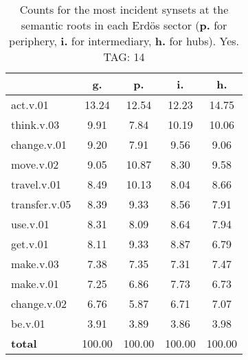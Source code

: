 \begin{table}[h!]
\begin{center}
\begin{tabular}{| l || c | c | c | c |}\hline
 & {\bf g.} & {\bf p.} & {\bf i.} & {\bf h.} \\\hline\hline
act.v.01 & 13.24  & 12.54  & 12.23  & 14.75 \\\hline
think.v.03 & 9.91  & 7.84  & 10.19  & 10.06 \\\hline
change.v.01 & 9.20  & 7.91  & 9.56  & 9.06 \\\hline
move.v.02 & 9.05  & 10.87  & 8.30  & 9.58 \\\hline
travel.v.01 & 8.49  & 10.13  & 8.04  & 8.66 \\\hline
transfer.v.05 & 8.39  & 9.33  & 8.56  & 7.91 \\\hline
use.v.01 & 8.31  & 8.09  & 8.64  & 7.94 \\\hline
get.v.01 & 8.11  & 9.33  & 8.87  & 6.79 \\\hline
make.v.03 & 7.38  & 7.35  & 7.31  & 7.47 \\\hline
make.v.01 & 7.25  & 6.86  & 7.73  & 6.73 \\\hline
change.v.02 & 6.76  & 5.87  & 6.71  & 7.07 \\\hline
be.v.01 & 3.91  & 3.89  & 3.86  & 3.98 \\\hline\hline
{{\bf total}} & 100.00  & 100.00  & 100.00  & 100.00 \\\hline
\end{tabular}
\caption{Counts for the most incident synsets at the semantic roots in each Erd\"os sector ({\bf p.} for periphery, {\bf i.} for intermediary, {\bf h.} for hubs). Yes. TAG: 14}
\end{center}
\end{table}